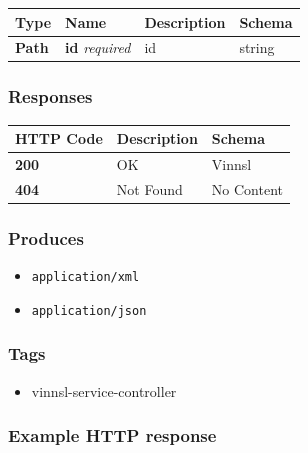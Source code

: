 \begin{longtable}[]{@{}llll@{}}
\toprule
Type & Name & Description & Schema\tabularnewline
\midrule
\endhead
\textbf{Path} & \textbf{id} \emph{required} & id & string\tabularnewline
\bottomrule
\end{longtable}

\subsubsection{Responses}\label{responses-3}

\begin{longtable}[]{@{}lll@{}}
\toprule
HTTP Code & Description & Schema\tabularnewline
\midrule
\endhead
\textbf{200} & OK & Vinnsl\tabularnewline
\textbf{404} & Not Found & No Content\tabularnewline
\bottomrule
\end{longtable}

\subsubsection{Produces}\label{produces-3}

\begin{itemize}
\tightlist
\item
  \texttt{application/xml}
\item
  \texttt{application/json}
\end{itemize}

\subsubsection{Tags}\label{tags-3}

\begin{itemize}
\tightlist
\item
  vinnsl-service-controller
\end{itemize}

\subsubsection{Example HTTP response}\label{example-http-response-2}

